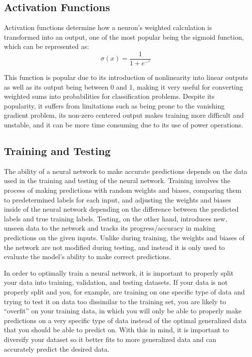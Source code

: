 \documentclass[12pt, letter]{article}
\begin{document}
\subsection{Activation Functions}

Activation functions determine how a neuron’s weighted calculation is transformed into an output, one of the most popular being the sigmoid function, which can be represented as:
\begin{equation}
\sigma(x)= \frac{1}{1+e^-^x}
\end{equation}
	
This function is popular due to its introduction of nonlinearity into linear outputs as well as its output being between 0 and 1, making it very useful for converting weighted sums into probabilities for classification problems. Despite its popularity, it suffers from limitations such as being prone to the vanishing gradient problem, its non-zero centered output makes training more difficult and unstable, and it can be more time consuming due to its use of power operations. 


\subsection{Training and Testing}

The ability of a neural network to make accurate predictions depends on the data used in the training and testing of the neural network. Training involves the process of making predictions with random weights and biases, comparing them to predetermined labels for each input, and adjusting the weights and biases inside of the neural network depending on the difference between the predicted labels and true training labels. Testing, on the other hand, introduces new, unseen data to the network and tracks its progress/accuracy in making predictions on the given inputs. Unlike during training, the weights and biases of the network are not modified during testing, and instead it is only used to evaluate the model’s ability to make correct predictions. 

In order to optimally train a neural network, it is important to properly split your data into training, validation, and testing datasets. If your data is not properly split and you, for example, are training on one specific type of data and trying to test it on data too dissimilar to the training set, you are likely to “overfit” on your training data, in which you will only be able to properly make predictions on a very specific type of data instead of the optimal generalized data that you should be able to predict on. With this in mind, it is important to diversify your dataset so it better fits to more generalized data and can accurately predict the desired data. 
\end{document}
